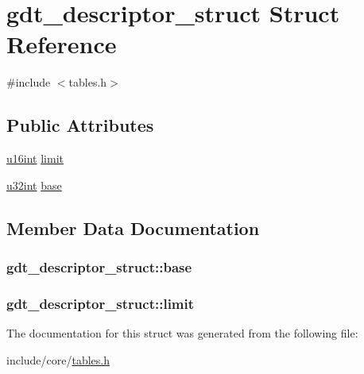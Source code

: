\hypertarget{structgdt__descriptor__struct}{}\section{gdt\+\_\+descriptor\+\_\+struct Struct Reference}
\label{structgdt__descriptor__struct}


{\ttfamily \#include $<$tables.\+h$>$}

\subsection*{Public Attributes}
\begin{DoxyCompactItemize}
\item 
\hyperlink{system_8h_a863d9497073aad2b991aeab2211d87af}{u16int} \hyperlink{structgdt__descriptor__struct_a3c8ae013805dd982b25f0d62e3cdee0e}{limit}
\item 
\hyperlink{system_8h_a757de76cafbcddaac0d1632902fe4cb8}{u32int} \hyperlink{structgdt__descriptor__struct_aa47407e7b435c214d0cdd22cb66f0e71}{base}
\end{DoxyCompactItemize}


\subsection{Member Data Documentation}
\hypertarget{structgdt__descriptor__struct_aa47407e7b435c214d0cdd22cb66f0e71}{}
\subsubsection[{base}]{ gdt\+\_\+descriptor\+\_\+struct\+::base}\label{structgdt__descriptor__struct_aa47407e7b435c214d0cdd22cb66f0e71}
\hypertarget{structgdt__descriptor__struct_a3c8ae013805dd982b25f0d62e3cdee0e}{}
\subsubsection[{limit}]{ gdt\+\_\+descriptor\+\_\+struct\+::limit}\label{structgdt__descriptor__struct_a3c8ae013805dd982b25f0d62e3cdee0e}


The documentation for this struct was generated from the following file\+:\begin{DoxyCompactItemize}
\item 
include/core/\hyperlink{tables_8h}{tables.\+h}\end{DoxyCompactItemize}

